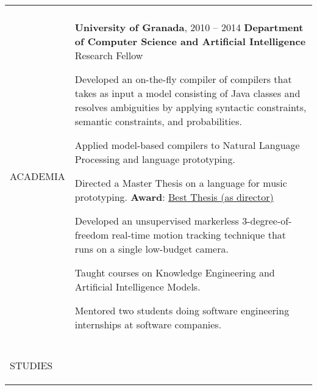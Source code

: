 \documentclass[letterpaper,10pt,oneside]{article}
\newcommand{\DatestampY}[1]{#1}
\newcommand{\sref}[2]{%
    \href{https://0/local/attachments/#1}{\textcolor{hiddenblue}{#2}}%
}
\newenvironment{body}
{\par\par
\begin{longtable}{p{0.145\textwidth}p{0.81\textwidth}}}
{\par\end{longtable}\par}
\renewcommand{\section}[3]{\\[-0.2cm]\pdfbookmark[2]{#2}{#3}\\%
\raggedleft  %
{\fontsize{9.5pt}{9.5pt}\selectfont\bfseries\raggedright%
\MakeUppercase{#1}}&}
\begin{document}
\begin{body}
\section{Academia}{Academia}{PDF:Academia}

\textbf{University of Granada}, \DatestampY{2010} -- \DatestampY{2014} \vspace{0.06cm} \newline
\phantom{g}\textbf{Department of Computer Science and Artificial Intelligence} \textemdash{ }Research Fellow
\begin{comp}
\item Developed an on-the-fly compiler of compilers that takes as input a model consisting of Java classes and resolves ambiguities by applying syntactic constraints, semantic constraints, and probabilities.
\item Applied model-based compilers to Natural Language Processing and language prototyping.
\item Directed a Master Thesis on a language for music prototyping. \textbf{Award}: \sref{UGR-Award-BestMasterThesis-MusicPrototyping.pdf}{Best Thesis (as director)}
\item Developed an unsupervised markerless 3-degree-of-freedom real-time motion tracking technique that runs on a single low-budget camera.
\item Taught courses on Knowledge Engineering and Artificial Intelligence Models.
\item Mentored two students doing software engineering internships at software companies.
\end{comp}

\section{Studies}{Studies}{PDF:Studies}


\end{body}
\end{document}
